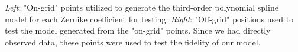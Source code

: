 \textit{Left}: "On-grid" points utilized to generate the third-order polynomial spline model for each Zernike coefficient for testing. \textit{Right}: "Off-grid" positions used to test the model generated from the "on-grid" points. Since we had directly observed data, these points were used to test the fidelity of our model.
\label{fig:inst_on_off_grid}  